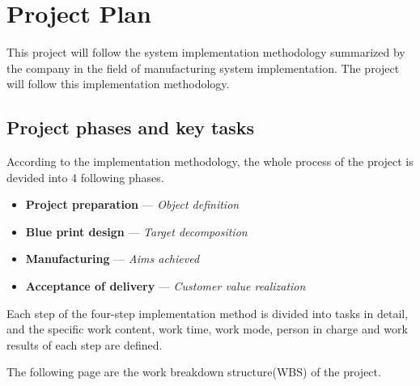 \chapter{Project Plan}

This project will follow the system implementation methodology summarized by the company in the field of manufacturing system implementation. The project will follow this implementation methodology.

\section{Project phases and key tasks}

According to the implementation methodology, the whole process of the project is devided into 4 following phases.

\begin{itemize}
	\item \textbf{Project preparation} --- \textit{Object definition}

	\item \textbf{Blue print design} --- \textit{Target decomposition}

	\item \textbf{Manufacturing} --- \textit{Aims achieved}

	\item \textbf{Acceptance of delivery} --- \textit{Customer value realization}
\end{itemize}

Each step of the four-step implementation method is divided into tasks in detail, and the specific work content, work time, work mode, person in charge and work results of each step are defined.

The following page are the work breakdown structure(WBS) of the project.

